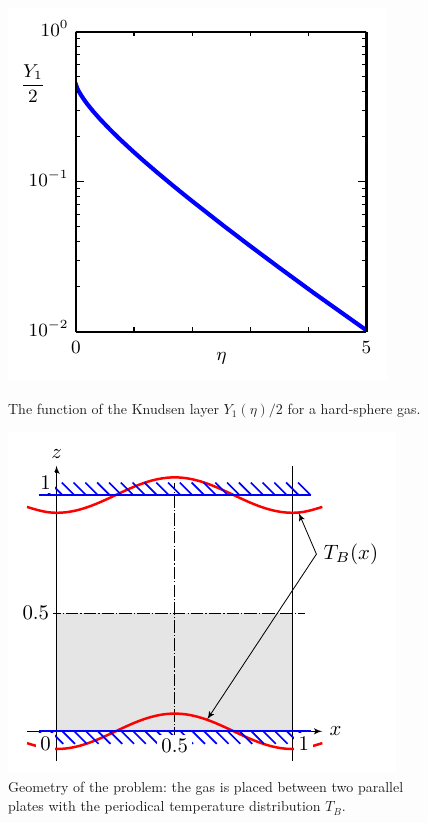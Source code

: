\documentclass[smallextended, referee]{svjour3} %
\begin{document}
\begin{figure}[ht]
	\centering
	\begin{minipage}{.48\textwidth}
		\centering
		\includegraphics{Fig1}
		\caption{The function of the Knudsen layer \(Y_1(\eta)/2\) for a hard-sphere gas.}
		\label{fig:Y1}
	\end{minipage}
	\quad
	\begin{minipage}{.48\textwidth}
		\centering
		\includegraphics{Fig2}
		\vspace{13pt}
		\caption{Geometry of the problem: the gas is placed between two parallel plates
			with the periodical temperature distribution \(T_B\).}
		\label{fig:geometry}
	\end{minipage}
\end{figure}
\end{document}
